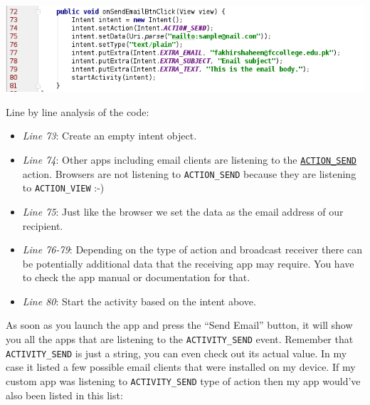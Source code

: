 \begin{center}
	\includegraphics[scale=0.4]{chapters/ch09/images/27}
\end{center}

Line by line analysis of the code:

\begin{itemize}
	\item \textit{Line 73}: Create an empty intent object.
	
	\item \textit{Line 74}: Other apps including email clients are listening to the \href{https://developer.android.com/reference/android/content/Intent.html#ACTION_SEND}{\texttt{ACTION\_SEND}} action. Browsers are not listening to \texttt{ACTION\_SEND} because they are listening to \texttt{ACTION\_VIEW} :-)
	
	\item \textit{Line 75}: Just like the browser we set the data as the email address of our recipient.
	
	\item \textit{Line 76-79}: Depending on the type of action and broadcast receiver there can be potentially additional data that the receiving app may require. You have to check the app manual or	documentation for that.
	
	\item \textit{Line 80}: Start the activity based on the intent above.
	
\end{itemize}

As soon as you launch the app and press the ``Send Email'' button, it will show you all the apps that are listening to the \texttt{ACTIVITY\_SEND} event. Remember that \texttt{ACTIVITY\_SEND} is just a string, you can even check out its actual value. In my case it listed a few possible email clients that were installed on my device. If my custom app was listening to \texttt{ACTIVITY\_SEND} type of action then my app would've also been listed in this list:


